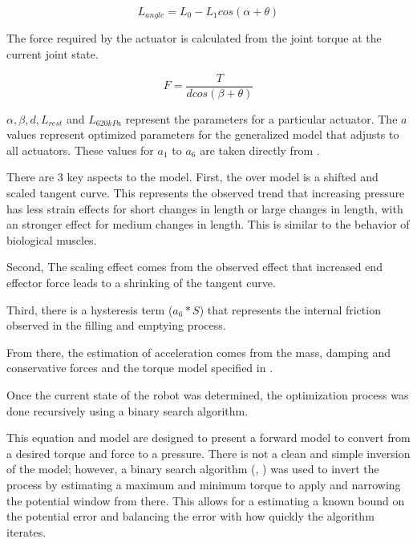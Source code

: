 \begin{equation}
L_{angle} = L_{0} - L_{1} cos(\alpha + \theta)
\end{equation}

The force required by the actuator is calculated from the joint torque at the current joint state.

\begin{equation}
F = \dfrac{T}{d cos(\beta + \theta)}
\end{equation}

$\alpha, \beta, d, L_{rest}$ and $L_{620 kPa}$ represent the parameters for a 
particular actuator. The $a$ values represent optimized parameters
for the generalized model that adjusts to all actuators. These values for $a_{1}$ to $a_{6}$ are taken directly from \cite{HuntPMuscles}.

There are 3 key aspects to the model. First, the over model is a shifted and 
scaled tangent curve. This represents the observed trend that increasing 
pressure has less strain effects for short changes in length or large changes in 
length, with an stronger effect for medium changes in length. This is similar to 
the behavior of biological muscles.

Second, The scaling effect comes from the observed
effect that increased end effector force leads to a shrinking of the tangent 
curve.

Third, there is a hysteresis term ($a_{6} * S$) that represents the internal
friction observed in the filling and emptying process.

From there, the estimation of acceleration comes from the mass, 
damping and conservative forces and the torque model specified in
.


Once the current state of the robot was determined, the optimization process was 
done recursively using a binary search algorithm. 

This equation and model are designed to present a forward model to convert from 
a desired torque and force to a pressure. There is not a clean and simple 
inversion of the model; however, a binary search algorithm 
(, ) was used to invert 
the process by estimating a maximum and minimum torque to apply and narrowing 
the
potential window from there. This allows for a estimating a known bound on the 
potential error and balancing the error with how quickly the algorithm iterates.

